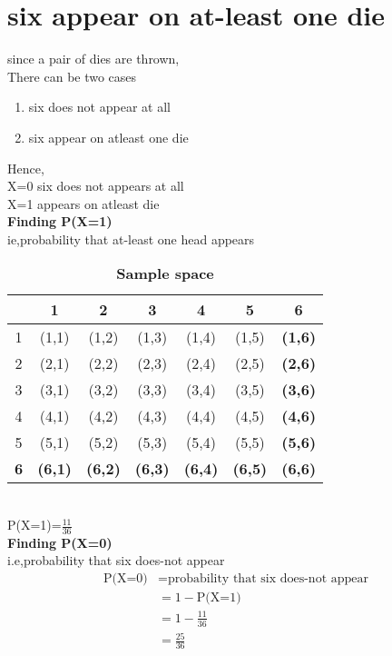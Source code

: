 \documentclass[11pt,a4paper,twocolumn]{article}
\begin{document}
\section{six appear on at-least one die}
since a pair of dies are thrown,\\
There can be two cases
\begin{enumerate}
    \item six does not appear at all
    \item six appear on atleast one die
\end{enumerate}
Hence,\\ X=0 six does not appears at all\\
X=1 appears on atleast die
\\ \textbf{Finding P(X=1)}\\
ie,probability that at-least one head appears
\begin{table}[h]
    \centering
    \begin{tabular}{|c|c|c|c|c|c|c|}
    \hline
         &1&2&3&4&5&6\\  
         \hline
         1&(1,1)&(1,2)&(1,3)&(1,4)&(1,5)&\textbf{(1,6)}\\
         \hline
         2&(2,1)&(2,2)&(2,3)&(2,4)&(2,5)&\textbf{(2,6)}\\
         \hline
         3&(3,1)&(3,2)&(3,3)&(3,4)&(3,5)&\textbf{(3,6)}\\
         \hline
         4&(4,1)&(4,2)&(4,3)&(4,4)&(4,5)&\textbf{(4,6)}\\
         \hline
         5&(5,1)&(5,2)&(5,3)&(5,4)&(5,5)&\textbf{(5,6)}\\
         \hline
         \textbf{6}&\textbf{(6,1)}&\textbf{(6,2)}&\textbf{(6,3)}&\textbf{(6,4)}&\textbf{(6,5)}&\textbf{(6,6)}\\
         \hline
         
    \end{tabular}
    \caption{\textbf{Sample space}}
\end{table}
\\[5pt]
P(X=1)=$\frac{11}{36}$\\[5pt]
\textbf{Finding P(X=0)}
\\i.e,probability that six does-not appear
\begin{align*}
    \text{P(X=0)}&=\text{probability that six does-not appear}\\
    &=1-\text{P(X=1)}\\
    &=1-\frac{11}{36}\\
    &=\frac{25}{36}
\end{align*}
\end{document}
